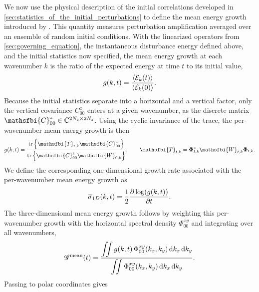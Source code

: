 We now use the physical description of the initial correlations developed in \cref{sec:statistics_of_the_initial_perturbations} to define the mean energy growth introduced by \citet{frame-towne-2024}. This quantity measures perturbation amplification averaged over an ensemble of random initial conditions. With the linearized operators from \cref{sec:governing_equation}, the instantaneous disturbance energy defined above, and the initial statistics now specified, the mean energy growth at each wavenumber \(k\) is the ratio of the expected energy at time \(t\) to its initial value,
\begin{equation}
    \label{eq:mean_energy_growth_def}
    g(k,t)
    =
    \frac{\left\langle \mathcal{E}_k(t) \right\rangle}{\left\langle \mathcal{E}_k(0) \right\rangle}.
\end{equation}
Because the initial statistics separate into a horizontal and a vertical factor, only the vertical covariance \(C_{00}^{z}\) enters at a given wavenumber, as the discrete matrix \(\mathsfbi{C}_{00}^{z}\in\mathbb{C}^{2N_z\times 2N_z}\). Using the cyclic invariance of the trace, the per-wavenumber mean energy growth is then
\begin{equation}
    g(k,t)
    =
    \frac{
      \tr
      \left\{
        \mathsfbi{T}_{t,k}\mathsfbi{C}_{00}^{z}
      \right\}
    }{
      \tr
      \left\{
        \mathsfbi{C}_{00}^{z}\mathsfbi{W}_{0,k}
      \right\}
    },
    \qquad
    \mathsfbi{T}_{t,k}
    =
    \boldsymbol{\Phi}_{t,k}^{*}\mathsfbi{W}_{t,k}\boldsymbol{\Phi}_{t,k}.
    \label{eq:T_operator_definition}
\end{equation}
We define the corresponding one-dimensional growth rate associated with the per-wavenumber mean energy growth as
\begin{equation}
    \label{eq:sigma_1d}
    \overline{\sigma}_{1D}(k,t)
    =
    \frac{1}{2}
    \frac{\partial 
        \log\!\left(g(k,t)\right)
    }{\partial t}.
\end{equation}
The three-dimensional mean energy growth follows by weighting this per-wavenumber growth with the horizontal spectral density \(\Phi_{00}^{xy}\) and integrating over all wavenumbers,
\begin{equation}
    \mathscr{G}^{\mathrm{mean}}(t)
    =
    \frac{
      \displaystyle
      \iint
      g(k,t)\,
      \Phi_{00}^{xy}(k_x,k_y)
      \,\mathrm{d}k_x\,\mathrm{d}k_y
    }{
      \displaystyle
      \iint
      \Phi_{00}^{xy}(k_x,k_y)
      \,\mathrm{d}k_x\,\mathrm{d}k_y
    }.
    \label{eq:gmean_continuous_fourier}
\end{equation}
Passing to polar coordinates gives
